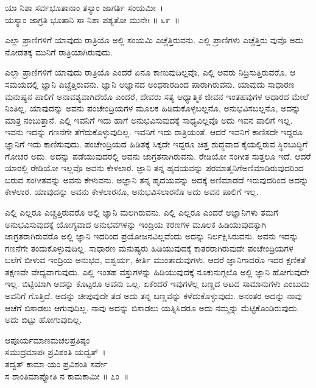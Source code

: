 \begin{shloka}
ಯಾ ನಿಶಾ ಸರ್ವಭೂತಾನಾಂ ತಸ್ಯಾಂ ಜಾಗರ್ತಿ ಸಂಯಮೀ~।\\ಯಸ್ಯಾಂ ಜಾಗ್ರತಿ ಭೂತಾನಿ ಸಾ ನಿಶಾ ಪಶ್ಯತೋ ಮುನೇಃ \hfill॥ ೬೯~॥
\end{shloka}

\begin{artha}
ಎಲ್ಲಾ ಪ್ರಾಣಿಗಳಿಗೆ ಯಾವುದು ರಾತ್ರಿಯೊ ಅಲ್ಲಿ ಸಂಯಮಿ ಎಚ್ಚೆತ್ತಿರುವನು. ಎಲ್ಲಿ ಪ್ರಾಣಿಗಳು ಎಚ್ಚೆತ್ತಿರು ವುವೊ ಅದು ನೋಡತಕ್ಕ ಮುನಿಗೆ ರಾತ್ರಿಯಾಗಿರುವುದು.
\end{artha}

ಎಲ್ಲಾ ಪ್ರಾಣಿಗಳಿಗೆ ಯಾವುದು ರಾತ್ರಿಯೊ ಎಂದರೆ ಏನೂ ಕಾಣುವುದಿಲ್ಲವೊ, ಎಲ್ಲಿ ಅವರು ನಿದ್ರಿಸುತ್ತಿರುವರೊ, ಆ ಸಮಯದಲ್ಲಿ ಜ್ಞಾನಿ ಎಚ್ಚೆತ್ತಿರುವನು. ಜ್ಞಾನಿ ಅಜ್ಞಾನದ ಅಂಧಕಾರ\-ದಿಂದ ಪಾರಾಗಿರುವನು. ಯಾವುದು ಸಾಧಾರಣ ಮನುಷ್ಯನ ಪಾಲಿಗೆ ಅನಾವಶ್ಯವಾಗಿದೆಯೊ ಎಂದರೆ, ದೇವರು ಸತ್ಯ ಆಧ್ಯಾತ್ಮಿಕ ಜೀವನ ಇಂತಹವುಗಳ ಆಧಾರದ ಮೇಲೆ ನಿಂತಿಲ್ಲ, ಯಾವುದನ್ನು ಅವನು ಪಂಚೇಂದ್ರಿಯಗಳ ಮೂಲಕ ಹಿಡಿದುಕೊಳ್ಳಬಲ್ಲನೊ, ಅನುಭವಿಸಬಲ್ಲನೊ, ಅದನ್ನು ಮಾತ್ರ ನಂಬುತ್ತಾನೆ. ಎಲ್ಲಿ ಇವನಿಗೆ ಇದು ಹಾಗೆ ಅನುಭವಿಸುವುದಕ್ಕೆ ಸಾಧ್ಯವಿಲ್ಲವೊ ಅದು ಇವನ ಪಾಲಿಗೆ ಇಲ್ಲ. ಇವನು ಇದನ್ನು ಗಣನೆಗೇ ತೆಗೆದುಕೊಳ್ಳುವುದಿಲ್ಲ. ಇವನಿಗೆ ಇದು ರಾತ್ರಿಯಂತೆ. ಆದರೆ ಇವನಿಗೆ ಕಾಣಿಸದೇ ಇದ್ದರೂ ಜ್ಞಾನಿಗೆ ಇದು ಕಾಣಿಸುವುದು. ಪಂಚೇಂದ್ರಿಯದ ಹಿಡಿತಕ್ಕೆ ಸಿಕ್ಕದೇ ಇದ್ದರೂ ಚಿತ್ತ ಶುದ್ಧವಾದ ಕೈಯಲ್ಲಿರುವ ಸ್ಥಿರಬುದ್ಧಿಗೆ ಗೋಚರ ಅದು. ಅದನ್ನು ಪಡೆಯುವುದರಲ್ಲಿ ಅವನು ಜಾಗ್ರತನಾಗಿರುವನು. ರೇಡಿಯೋ ಸಂಗೀತ ಸುತ್ತಲೂ ಇದೆ. ಆದರೆ ಯಾರಲ್ಲಿ ರೇಡಿಯೋ ಇಲ್ಲವೊ ಅವನು ಕೇಳಲಾರ. ಜ್ಞಾನಿ ತನ್ನ ಹೃದಯವನ್ನು ಪರಮಾತ್ಮನಿಗೆ\break ಅಣಿಮಾಡಿರುವುದರಿಂದ ಬರುವ ಸಂಗೀತವನ್ನು ಅವನು ಕೇಳುವನು. ಅಜ್ಞಾನಿ ತನ್ನ ಹೃದಯವನ್ನು ಅದಕ್ಕೆ ಅಣಿಮಾಡದೆ ಇರುವುದರಿಂದ ಅದನ್ನು ಕೇಳಲಾರ. ಯಾವುದನ್ನು ಅವನು ಕೇಳಲಾರನೊ, ಅನುಭವಿಸಲಾರನೊ ಅದು ಅವನ ಪಾಲಿಗೆ ಇಲ್ಲ.

ಎಲ್ಲಿ ಎಲ್ಲರೂ ಎಚ್ಚತ್ತಿರುವರೊ ಅಲ್ಲಿ ಜ್ಞಾನಿ ಮಲಗಿರುವನು. ಎಲ್ಲಿ ಎಲ್ಲರೂ ಎಂದರೆ ಅಜ್ಞಾನಿಗಳು ತಮಗೆ ಅನುಭವಿಸುವುದಕ್ಕೆ ಯೋಗ್ಯವಾದ ಅನುಭವಗಳನ್ನು ಇಂದ್ರಿಯ ಕರಣಗಳ ಮೂಲಕ ಹಿಡಿಯುವುದಕ್ಕಾಗಿ ಜಾಗ್ರತರಾಗಿರುವರೊ ಅಲ್ಲಿ ಜ್ಞಾನಿ ಇದರಿಂದ ಪ್ರಯೋಜನವಿಲ್ಲವೆಂದು ಅದನ್ನು ನಿರ್ಲಕ್ಷಿಸಿರುವನು. ಅವನು ಇದನ್ನು ಗಣನೆಗೇ ತಂದುಕೊಳ್ಳುವುದಿಲ್ಲ. ಸಾಧಾರಣ ಮನುಷ್ಯರು ಹಿಡಿಯುವುದಕ್ಕೆ ಕಾತರರಾಗಿರುವುದೇ ಪಂಚೇಂದ್ರಿಯಗಳ ಬಲೆಗೆ ಬೀಳುವ ಇಂದ್ರಿಯ ಅನುಭವ, ಐಶ್ವರ್ಯ, ಕೀರ್ತಿ ಮುಂತಾದುವುಗಳು. ಆದರೆ ಜ್ಞಾನಿಗಾದರೊ ಇದರ ಕ್ಷಣಿಕತೆ ತಕ್ಷಣವೇ ವೇದ್ಯವಾಗುವುದು. ಎಲ್ಲಿ ಇಂತಹ ವಸ್ತುಗಳನ್ನು ಹಿಡಿಯುವುದಕ್ಕೆ ನೂಕುನುಗ್ಗಲೊ ಅಲ್ಲಿ ಜ್ಞಾನಿ ಹೋಗುವುದೇ ಇಲ್ಲ. ಬಿಟ್ಟಿಯಾಗಿ ಅದನ್ನು ಕೊಟ್ಟರೂ ಅವನು ಒಲ್ಲ. ಏಕೆಂದರೆ ಇವುಗಳೆಲ್ಲ ಬಣ್ಣದ ಆಟದ ಸಾಮಾನುಗಳು ಎಂಬುದು ಅವನಿಗೆ ಗೊತ್ತಿದೆ. ಅದನ್ನು ಚೀಪುವುದೇ ತಡ ಅದು ತನ್ನ ಬಣ್ಣವನ್ನು ಕಳೆದುಕೊಳ್ಳುವುದು. ಅನಂತರ ಅದನ್ನು ನಾವು ಆಚೆಗೆ ಬಿಸಾಡಲು ಆಗುವುದಿಲ್ಲ. ನಾವು ಅದನ್ನು ಬಿಸಾಡಲು ಯತ್ನಿಸಿದರೂ ಅದು ನಮ್ಮನ್ನು ಮೆಟ್ಟಿಕೊಂಡಿರುವುದು. ಅದು ಬಿಟ್ಟು ಹೋಗುವುದಿಲ್ಲ.

\begin{shloka}
ಆಪೂರ್ಯಮಾಣಮಚಲಪ್ರತಿಷ್ಠಂ\\ಸಮುದ್ರಮಾಪಃ ಪ್ರವಿಶಂತಿ ಯದ್ವತ್~।\\ತದ್ವತ್ ಕಾಮಾ ಯಂ ಪ್ರವಿಶಂತಿ ಸರ್ವೇ\\ಸ ಶಾಂತಿಮಾಪ್ನೋತಿ ನ ಕಾಮಕಾಮೀ \hfill॥ ೭ಂ~॥
\end{shloka}

